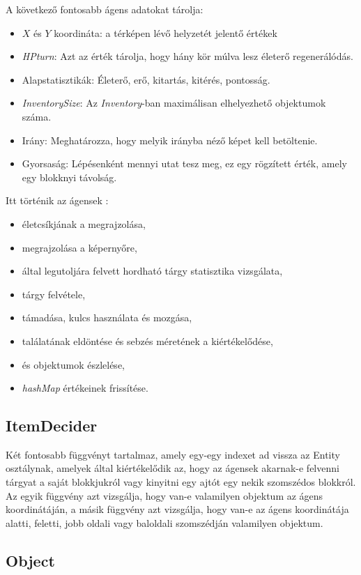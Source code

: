 A következő fontosabb ágens adatokat tárolja:
\begin{itemize}
    \item $X$ és $Y$ koordináta: a térképen lévő helyzetét jelentő értékek
    \item \textit{HPturn}: Azt az érték tárolja, hogy hány kör múlva lesz életerő regenerálódás.
    \item Alapstatisztikák: Életerő, erő, kitartás, kitérés, pontosság.
    \item \textit{InventorySize}: Az \textit{Inventory}-ban maximálisan elhelyezhető objektumok száma.
    \item Irány: Meghatározza, hogy melyik irányba néző képet kell betöltenie.
    \item Gyorsaság: Lépésenként mennyi utat tesz meg, ez egy rögzített érték, amely egy blokknyi távolság.
\end{itemize}

\noindent Itt történik az ágensek :
\begin{itemize}
    \item életcsíkjának a megrajzolása,
    \item megrajzolása a képernyőre,
    \item által legutoljára felvett hordható tárgy statisztika vizsgálata,
    \item tárgy felvétele,
    \item támadása, kulcs használata és mozgása,
    \item találatának eldöntése és sebzés méretének a kiértékelődése,
    \item és objektumok észlelése,
    \item \textit{hashMap} értékeinek frissítése.
\end{itemize} 

\subsection{ItemDecider}

Két fontosabb függvényt tartalmaz, amely egy-egy indexet ad vissza az Entity osztálynak, amelyek által kiértékelődik az, hogy az ágensek akarnak-e felvenni tárgyat a saját blokkjukról vagy kinyitni egy ajtót egy nekik szomszédos blokkról.
Az egyik függvény azt vizsgálja, hogy van-e valamilyen objektum az ágens koordinátáján, a másik függvény azt vizsgálja, hogy van-e az ágens koordinátája
alatti, feletti, jobb oldali vagy baloldali szomszédján valamilyen objektum.

\subsection{Object}

